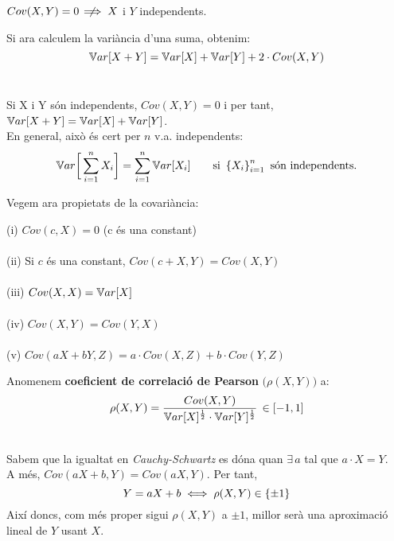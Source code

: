 \begin{obs}
  $Cov(X,Y) = 0 \hspace{0.2cm}\not\hspace{-0.25cm} \implies X$ i $Y$ independents. %
\end{obs}

Si ara calculem la variància d'una suma, obtenim: $$\mathbb{V} ar[X+Y] = \mathbb{V} ar[X] + \mathbb{V} ar[Y] + 2\cdot Cov(X,Y)$$ \\

\begin{obs}
  Si X i Y són independents, $Cov(X,Y) = 0$ i per tant, $\mathbb{V} ar[X+Y] = \mathbb{V} ar[X] + \mathbb{V} ar[Y]$. \\
  En general, això és cert per $n$ v.a. independents: 
  \[
    \mathbb{V} ar\bigg[\sum_{i=1}^{n}X_{i} \bigg] = \sum_{i=1}^{n}\mathbb{V} ar[X_{i}] \qquad \text{si } \left\{X_{i}\right\}_{i=1}^{n} 
    \text{ són independents}.
  \]
\end{obs}

\newpage
Vegem ara propietats de la covariància:

\begin{properties}
  (i) $Cov(c, X) = 0$ (c és una constant) \\\\
  (ii) Si $c$ és una constant, $Cov(c + X,Y) = Cov(X,Y)$ \\\\
  (iii) $Cov(X,X) = \mathbb{V} ar[X]$ \\\\
  (iv) $Cov(X,Y) = Cov(Y,X)$ \\\\
  (v) $Cov(aX+bY, Z) = a\cdot Cov(X,Z) + b\cdot Cov(Y,Z)$
\end{properties}

\begin{defi}
  Anomenem \textbf{coeficient de correlació de Pearson} $\big(\rho(X,Y)\big)$ a:
  \[
    \rho(X,Y) = \frac{Cov(X,Y)}{\mathbb{V} ar[X]^{\frac{1}{2}}\cdot \mathbb{V} ar[Y]^{\frac{1}{2}}} \, \in [-1,1]
  \]
\end{defi}

\begin{obs} \- \\
  Sabem que la igualtat en \textit{Cauchy-Schwartz} es dóna quan $\exists \, a$ tal que $a\cdot X = Y$. \\
  A més, $Cov(aX + b, Y) = Cov(aX, Y)$. 
  Per tant, $$Y=aX + b \iff \rho(X,Y) \in \left\{\pm 1\right\}$$ Així doncs, com més proper sigui $\rho(X,Y)$ a $\pm 1$, 
  millor serà una aproximació lineal de $Y$ usant $X$.
\end{obs}
